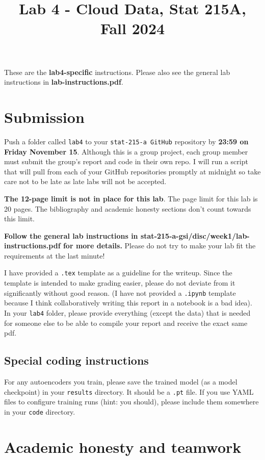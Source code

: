 \documentclass[letterpaper,12pt]{article}
\title{Lab 4 - Cloud Data, Stat 215A, Fall 2024\vspace{-2em}}
\date{}
\begin{document}
\maketitle

These are the \textbf{lab4-specific} instructions. Please also see the general lab instructions in \textbf{lab-instructions.pdf}.

\tableofcontents

\section{Submission}
Push a folder called \texttt{lab4} to your \texttt{stat-215-a GitHub} repository by \textbf{23:59 on Friday November 15}. Although this is a group project, each group member must submit the group's report and code in their own repo. I will run a script that will pull from each of your GitHub repositories promptly at midnight so take care not to be late as late labs will not be accepted.

\textbf{The 12-page limit is not in place for this lab}. The page limit for this lab is 20 pages. The bibliography and academic honesty sections don't count towards this limit.

\textbf{Follow the general lab instructions in stat-215-a-gsi/disc/week1/lab-instructions.pdf for more details.} Please do not try to make your lab fit the requirements at the last minute!

I have provided a \texttt{.tex} template as a guideline for the writeup. Since the template is intended to make grading easier, please do not deviate from it significantly without good reason. (I have not provided a \texttt{.ipynb} template because I think collaboratively writing this report in a notebook is a bad idea). In your \texttt{lab4} folder, please provide everything (except the data) that is needed for someone else to be able to compile your report and receive the exact same pdf.

\subsection{Special coding instructions}
For any autoencoders you train, please save the trained model (as a model checkpoint) in your \texttt{results} directory. It should be a \texttt{.pt} file. If you use YAML files to configure training runs (hint: you should), please include them somewhere in your \texttt{code} directory.

\section{Academic honesty and teamwork}
\end{document}
